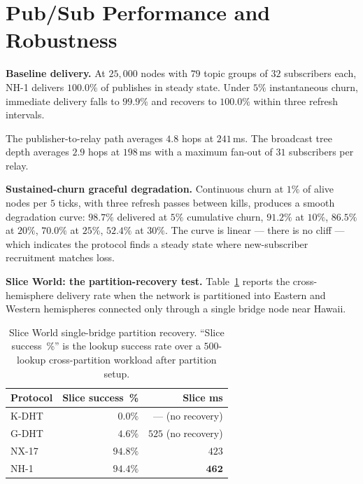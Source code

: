 \documentclass[twoside,nobib]{tufte-book}
\newcommand{\KDHT}{K-DHT\xspace}
\newcommand{\GDHT}{G-DHT\xspace}
\begin{document}
\section{Pub/Sub Performance and Robustness}

\textbf{Baseline delivery.} At $25{,}000$ nodes with $79$ topic
groups of $32$ subscribers each, NH-1 delivers $100.0\%$ of
publishes in steady state. Under $5\%$ instantaneous churn,
immediate delivery falls to $99.9\%$ and recovers to $100.0\%$
within three refresh intervals.

The publisher-to-relay path averages $4.8$ hops at $241$\,ms.
The broadcast tree depth averages $2.9$ hops at $198$\,ms with a
maximum fan-out of $31$ subscribers per relay.

\textbf{Sustained-churn graceful degradation.} Continuous
churn at $1\%$ of alive nodes per $5$ ticks, with three refresh
passes between kills, produces a smooth degradation curve:
$98.7\%$ delivered at $5\%$ cumulative churn, $91.2\%$ at
$10\%$, $86.5\%$ at $20\%$, $70.0\%$ at $25\%$, $52.4\%$ at
$30\%$. The curve is linear --- there is no cliff --- which
indicates the protocol finds a steady state where new-subscriber
recruitment matches loss.

\textbf{Slice World: the partition-recovery test.}
Table~\ref{tab:slice} reports the cross-hemisphere delivery rate
when the network is partitioned into Eastern and Western
hemispheres connected only through a single bridge node near
Hawaii.

\begin{table}[h]
\centering
\caption{Slice World single-bridge partition recovery. ``Slice
success~\%'' is the lookup success rate over a $500$-lookup
cross-partition workload after partition setup.}
\label{tab:slice}
\small
\begin{tabular}{@{}lrr@{}}
\toprule
\textbf{Protocol} & \textbf{Slice success~\%} & \textbf{Slice ms} \\
\midrule
\KDHT  & $0.0\%$ & --- (no recovery) \\
\GDHT  & $4.6\%$ & $525$ (no recovery) \\
NX-17  & $94.8\%$ & $423$ \\
NH-1   & $\mathbf{94.4\%}$ & $\mathbf{462}$ \\
\bottomrule
\end{tabular}
\end{table}
\end{document}
